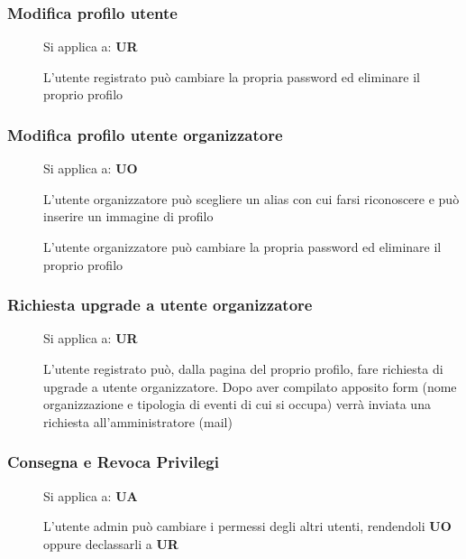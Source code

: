 \documentclass{article}
\begin{document}
\subsubsection{Modifica profilo utente} \label{rf_10}
\begin{description}
    \item[] Si applica a: \textbf{UR}
    \item[] L'utente registrato può cambiare la propria password ed eliminare il proprio profilo
\end{description}
\subsubsection{Modifica profilo utente organizzatore} \label{rf_11}
\begin{description}
    \item[] Si applica a: \textbf{UO}
    \item[] L'utente organizzatore può scegliere un alias con cui farsi riconoscere e può inserire un immagine di profilo
    \item[] L'utente organizzatore può cambiare la propria password ed eliminare il proprio profilo
\end{description}
\subsubsection{Richiesta upgrade a utente organizzatore} \label{rf_12}
\begin{description}
    \item[] Si applica a: \textbf{UR}
    \item[] L'utente registrato può, dalla pagina del proprio profilo, fare richiesta di upgrade a utente organizzatore. Dopo aver compilato apposito form (nome organizzazione e tipologia di eventi di cui si occupa) verrà inviata una richiesta all'amministratore (mail)
\end{description}
\subsubsection{Consegna e Revoca Privilegi} \label{rf_13}
\begin{description}
    \item[] Si applica a: \textbf{UA}
    \item[] L'utente admin può cambiare i permessi degli altri utenti, rendendoli \textbf{UO} oppure declassarli a \textbf{UR}
\end{description}
\clearpage
\end{document}
